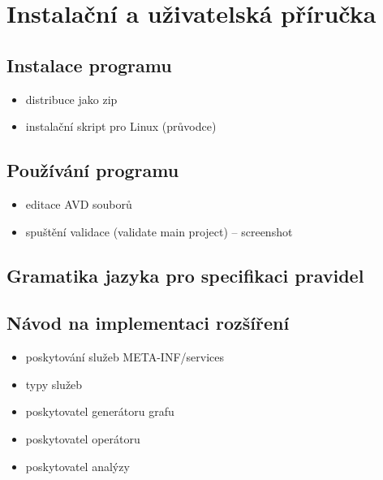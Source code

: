 \chapter{Instalační a uživatelská příručka}

\section{Instalace programu}
\begin{itemize}
\item distribuce jako zip
\item instalační skript pro Linux (průvodce)
\end{itemize}

\section{Používání programu}
\begin{itemize}
\item editace AVD souborů
\item spuštění validace (validate main project) -- screenshot
\end{itemize}

\section{Gramatika jazyka pro specifikaci pravidel}
\label{avd_grammar}


\section{Návod na implementaci rozšíření}
\begin{itemize}
\item poskytování služeb META-INF/services
\item typy služeb
\end{itemize}

\begin{itemize}
\item poskytovatel generátoru grafu
\item poskytovatel operátoru
\item poskytovatel analýzy
\end{itemize}
